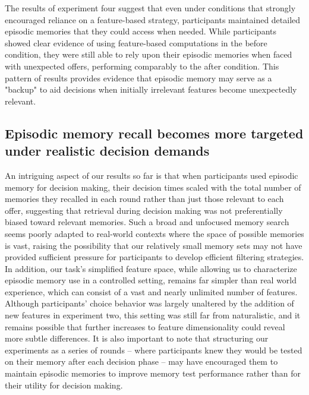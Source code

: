 \documentclass[10pt,letterpaper]{article}
\begin{document}
The results of experiment four suggest that even under conditions that strongly encouraged reliance on a feature-based strategy, participants maintained detailed episodic memories that they could access when needed. While participants showed clear evidence of using feature-based computations in the before condition, they were still able to rely upon their episodic memories when faced with unexpected offers, performing comparably to the after condition. This pattern of results provides evidence that episodic memory may serve as a "backup" to aid decisions when initially irrelevant features become unexpectedly relevant.

\subsection{Episodic memory recall becomes more targeted under realistic decision demands}

An intriguing aspect of our results so far is that when participants used episodic memory for decision making, their decision times scaled with the total number of memories they recalled in each round rather than just those relevant to each offer, suggesting that retrieval during decision making was not preferentially biased toward relevant memories. Such a broad and unfocused memory search seems poorly adapted to real-world contexts where the space of possible memories is vast, raising the possibility that our relatively small memory sets may not have provided sufficient pressure for participants to develop efficient filtering strategies. In addition, our task's simplified feature space, while allowing us to characterize episodic memory use in a controlled setting, remains far simpler than real world experience, which can consist of a vast and nearly unlimited number of features. Although participants' choice behavior was largely unaltered by the addition of new features in experiment two, this setting was still far from naturalistic, and it remains possible that further increases to feature dimensionality could reveal more subtle differences. It is also important to note that structuring our experiments as a series of rounds -- where participants knew they would be tested on their memory after each decision phase -- may have encouraged them to maintain episodic memories to improve memory test performance rather than for their utility for decision making.
\end{document}
